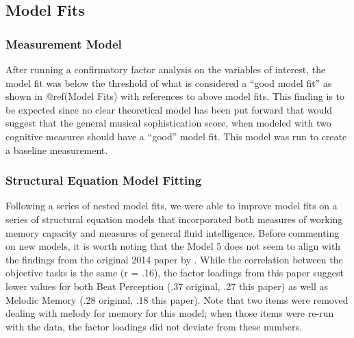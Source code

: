 \documentclass[]{book}
\begin{document}
\hypertarget{model-fits}{%
\subsection{Model Fits}\label{model-fits}}

\hypertarget{measurement-model-1}{%
\subsubsection{Measurement Model}\label{measurement-model-1}}

After running a confirmatory factor analysis on the variables of interest, the model fit was below the threshold of what is considered a ``good model fit'' as shown in @ref(Model Fits) with references to above model fits.
This finding is to be expected since no clear theoretical model has been put forward that would suggest that the general musical sophistication score, when modeled with two cognitive measures should have a ``good'' model fit.
This model was run to create a baseline measurement.

\hypertarget{structural-equation-model-fitting}{%
\subsubsection{Structural Equation Model Fitting}\label{structural-equation-model-fitting}}

Following a series of nested model fits, we were able to improve model fits on a series of structural equation models that incorporated both measures of working memory capacity and measures of general fluid intelligence.
Before commenting on new models, it is worth noting that the Model 5 does not seem to align with the findings from the original 2014 paper by \citep{mullensiefenMusicalityNonMusiciansIndex2014}.
While the correlation between the objective tasks is the same (r = .16), the factor loadings from this paper suggest lower values for both Beat Perception (.37 original, .27 this paper) as well as Melodic Memory (.28 original, .18 this paper).
Note that two items were removed dealing with melody for memory for this model; when those items were re-run with the data, the factor loadings did not deviate from these numbers.
\end{document}

